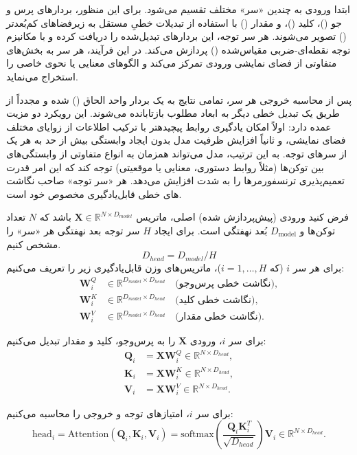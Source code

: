 ابتدا ورودی به چندین «سر» مختلف تقسیم می‌شود. برای این منظور، بردارهای پرس و جو ()، کلید ()، و مقدار () با استفاده از تبدیلات خطیِ مستقل به زیرفضاهای کم‌بُعدتر () تصویر می‌شوند. هر سر توجه، این بردارهای تبدیل‌شده را دریافت کرده و با مکانیزم توجه نقطه‌ای-ضربی مقیاس‌شده () پردازش می‌کند. در این فرآیند، هر سر به بخش‌های متفاوتی از فضای نمایشی ورودی تمرکز می‌کند و الگوهای معنایی یا نحوی خاصی را استخراج می‌نماید.

پس از محاسبه خروجی هر سر، تمامی نتایج به یک بردار واحد الحاق () شده و مجدداً از طریق یک تبدیل خطی دیگر به ابعاد مطلوب بازتابانده می‌شوند. این رویکرد دو مزیت عمده دارد: اولاً امکان یادگیری روابط پیچیدهتر با ترکیب اطلاعات از زوایای مختلف فضای نمایشی، و ثانیاً افزایش ظرفیت مدل بدون ایجاد وابستگی بیش از حد به هر یک از سرهای توجه. به این ترتیب، مدل می‌تواند همزمان به انواع متفاوتی از وابستگی‌های بین توکن‌ها (مثلاً روابط دستوری، معنایی یا موقعیتی) توجه کند که این امر قدرت تعمیم‌پذیری ترنسفورمرها را به شدت افزایش می‌دهد. هر «سر توجه» صاحب نگاشت های خطی قابل‌یادگیری مخصوص خود است.

فرض کنید ورودی (پیش‌پردازش شده) اصلی، ماتریس 
$\mathbf{X} \in \mathbb{R}^{N \times D_{model}}$
باشد که 
$N$ تعداد توکن‌ها و 
$D_{\text{model}}$ 
بُعد نهفتگی است. برای ایجاد $H$ سر توجه بعد نهفتگی هر «سر» را مشخص کنیم.
$$
D_{head} = D_{model} / H
$$
برای هر سر \(i\) (که \(i = 1, \dots, H\))، ماتریس‌های وزن قابل‌یادگیری زیر را تعریف می‌کنیم:  
\begin{align*}
	\mathbf{W}_i^Q &\in \mathbb{R}^{D_{model} \times D_{head}} \quad \text{(نگاشت خطی پرس‌وجو)}, \\
	\mathbf{W}_i^K &\in \mathbb{R}^{D_{model} \times D_{head}} \quad \text{(نگاشت خطی کلید)}, \\
	\mathbf{W}_i^V &\in \mathbb{R}^{D_{model} \times D_{head}} \quad \text{(نگاشت خطی مقدار)}.
\end{align*}

برای سر \(i\)، ورودی \(\mathbf{X}\) را به پرس‌وجو، کلید و مقدار تبدیل می‌کنیم:  
\begin{align*}
	\mathbf{Q}_i &= \mathbf{X} \mathbf{W}_i^Q \in \mathbb{R}^{N \times D_{head}}, \\
	\mathbf{K}_i &= \mathbf{X} \mathbf{W}_i^K \in \mathbb{R}^{N \times D_{head}}, \\
	\mathbf{V}_i &= \mathbf{X} \mathbf{W}_i^V \in \mathbb{R}^{N \times D_{head}}.
\end{align*}

برای سر \(i\)، امتیازهای توجه و خروجی را محاسبه می‌کنیم:  
$$
\text{head}_i = \text{Attention}(\mathbf{Q}_i, \mathbf{K}_i, \mathbf{V}_i) = \text{softmax}\left(\frac{\mathbf{Q}_i \mathbf{K}_i^T}{\sqrt{D_{head}}}\right) \mathbf{V}_i \in \mathbb{R}^{N \times D_{head}}.
$$

